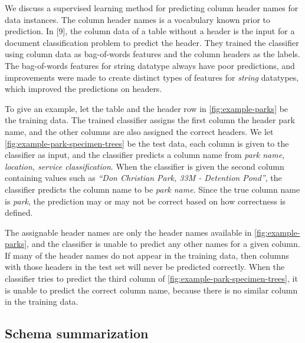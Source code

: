 We discuss a supervised learning method for predicting column header names for data instances. The column header names is a vocabulary known prior to prediction. In \cite{10.1145/3184558.3191601}[9], the column data of a table without a header is the input for a document classification problem to predict the header. They trained the classifier using column data as bag-of-words features and the column headers as the labels. The bag-of-words features for string datatype always have poor predictions, and improvements were made to create distinct types of features for \textit{string} datatypes, which improved the predictions on headers.

To give an example, let the table and the header row in \autoref{fig:example-parks} be the training data. The trained classifier assigns the first column the header park name, and the other columns are also assigned the correct headers. We let \autoref{fig:example-park-specimen-trees} be the test data, each column is given to the classifier as input, and the classifier predicts a column name from \textit{{park name, location, service classification}}. When the classifier is given the second column containing values such as \textit{``Don Christian Park, 33M - Detention Pond''}, the classifier predicts the column name to be \textit{park name}. Since the true column name is \textit{park}, the prediction may or may not be correct based on how correctness is defined.

The assignable header names are only the header names available in \autoref{fig:example-parks}, and the classifier is unable to predict any other names for a given column. If many of the header names do not appear in the training data, then columns with those headers in the test set will never be predicted correctly. When the classifier tries to predict the third column of \autoref{fig:example-park-specimen-trees}, it is unable to predict the correct column name, because there is no similar column in the training data.

\subsection{Schema summarization}
\label{ssec:SchemaSummarization}

